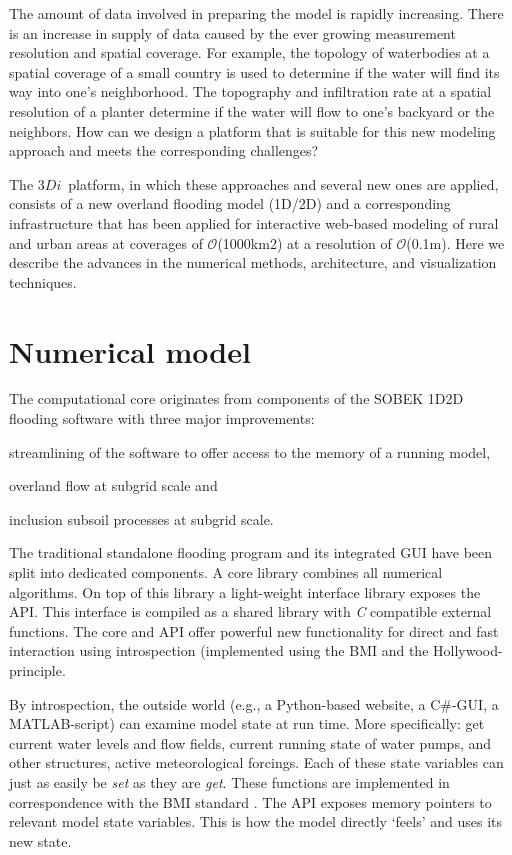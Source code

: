 \documentclass[a4paper]{article}
\DeclareRobustCommand{\orderof}{\ensuremath{\mathcal{O}}}
\DeclareRobustCommand{\threedi}{$3Di$~}
\begin{document}
The amount of data involved in preparing the model is rapidly increasing. There is an increase in supply of data caused by the ever growing measurement resolution and spatial coverage. For example, the topology of waterbodies at a spatial coverage of a small country is used to determine if the water will find its way into one's neighborhood. The topography and infiltration rate at a spatial resolution of a planter determine if the water will flow to one's backyard or the neighbors. How can we design a platform that is suitable for this new modeling approach and meets the corresponding challenges?

The \threedi  platform, in which these approaches and several new ones are applied, consists of a new overland flooding model (1D/2D) and a corresponding infrastructure that has been applied for interactive web-based modeling of rural and urban areas at coverages of \orderof(1000km2) at a resolution of \orderof(0.1m). Here we describe the advances in the numerical methods, architecture, and visualization techniques.

\section{Numerical model}
The computational core originates from components of the {SOBEK} 1D2D flooding software \citep{Stelling2006} with three major improvements: \begin{inparaenum}
\item streamlining of the software to offer access to the memory of a running model,
\item overland flow at subgrid scale and
\item inclusion subsoil processes at subgrid scale.
\end{inparaenum}

The traditional standalone flooding program and its integrated \ac{GUI} have been split into dedicated components. A core library combines all numerical algorithms. On top of this library a light-weight interface library exposes the \ac{API}. This interface is compiled as a shared library with \emph{C} compatible external functions. The core and \ac{API} offer powerful new functionality for direct and fast interaction using introspection (implemented using the \ac{BMI} and the Hollywood-principle.

By introspection, the outside world (e.g., a Python-based website, a C\#-\ac{GUI}, a MATLAB-script) can examine model state at run time. More specifically: get current water levels and flow fields, current running state of water pumps, and other structures, active meteorological forcings.
 Each of these state variables can just as easily be \emph{set} as they are \emph{get}. These functions are implemented in correspondence with the \ac{BMI} standard \citep{Peckham2013}. The \ac{API} exposes memory pointers to relevant model state variables. This is how the model directly `feels' and uses its new state.
\end{document}

